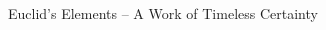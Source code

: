 \documentclass{beamer}
\begin{document}
\begin{frame}{Euclid's Elements -- A Work of Timeless Certainty}
{\begin{columns}[T,onlytextwidth]
\begin{column}{.34\textwidth}
{\begin{alertbox}
		\end{alertbox}
	  }
	 \end{column}
	 \begin{column}{.33\textwidth}
\end{column}
\end{columns}}
\end{frame}
\end{document}
